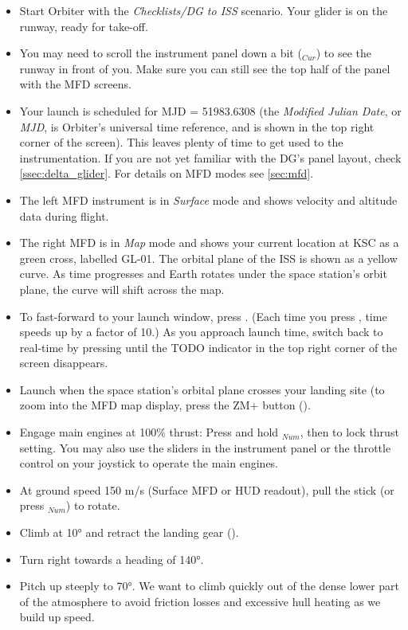 \documentclass[Orbiter User Manual.tex]{subfiles}
\begin{document}
\begin{itemize}
\item Start Orbiter with the \textit{Checklists/DG to ISS} scenario. Your glider is on the runway, ready for take-off.
\item You may need to scroll the instrument panel down a bit (\UArrow$_{Cur}$) to see the runway in front of you. Make sure you can still see the top half of the panel with the MFD screens.
\item Your launch is scheduled for MJD = 51983.6308 (the \textit{Modified Julian Date}, or \textit{MJD}, is Orbiter's universal time reference, and is shown in the top right corner of the screen). This leaves plenty of time to get used to the instrumentation. If you are not yet familiar with the DG's panel layout, check \ref{ssec:delta_glider}. For details on MFD modes see \ref{sec:mfd}.
\item The left MFD instrument is in \textit{Surface} mode and shows velocity and altitude data during flight.
\item The right MFD is in \textit{Map} mode and shows your current location at KSC as a green cross, labelled GL-01. The orbital plane of the ISS is shown as a yellow curve. As time progresses and Earth rotates under the space station's orbit plane, the curve will shift across the map.
\item To fast-forward to your launch window, press . (Each time you press , time speeds up by a factor of 10.) As you approach launch time, switch back to real-time by pressing  until the TODO indicator in the top right corner of the screen disappears.
\item Launch when the space station's orbital plane crosses your landing site (to zoom into the MFD map display, press the ZM+ button (\Shift{}).
\item Engage main engines at 100\% thrust: Press and hold \keystroke{+}$_{Num}$, then \Ctrl to lock thrust setting. You may also use the sliders in the instrument panel or the throttle control on your joystick to operate the main engines.
\item At ground speed 150 m/s (Surface MFD or HUD readout), pull the stick (or press $_{Num}$) to rotate.
\item Climb at 10° and retract the landing gear ().
\item Turn right towards a heading of 140°.
\item Pitch up steeply to 70°. We want to climb quickly out of the dense lower part of the atmosphere to avoid friction losses and excessive hull heating as we build up speed.

\end{itemize}
\end{document}
